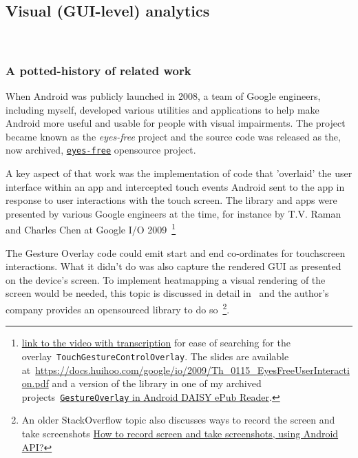 \subsection{Visual (GUI-level) analytics}~\label{sec:visual-gui-analytics}

\subsubsection{A potted-history of related work}
When Android was publicly launched in 2008, a team of Google engineers, including myself, developed various utilities and applications to help make Android more useful and usable for people with visual impairments. The project became known as the \emph{eyes-free} project and the source code was released as the, now archived, \href{https://code.google.com/archive/p/eyes-free/}{\texttt{eyes-free}} opensource project. 

A key aspect of that work was the implementation of code that 'overlaid' the user interface within an app and intercepted touch events Android sent to the app in response to user interactions with the touch screen. The library and apps were presented by various Google engineers at the time, for instance by T.V. Raman and Charles Chen at Google I/O 2009~\footnote{ \href{http://transcriptvids.com/v/xS-ju61vOQw.html}{link to the video with transcription} for ease of searching for the overlay~\texttt{TouchGestureControlOverlay}. The slides are available at~\url{https://docs.huihoo.com/google/io/2009/Th_0115_EyesFreeUserInteraction.pdf} and a version of the library in one of my archived projects~\href{https://github.com/julianharty/android-daisy-epub-reader/blob/master/src/com/google/marvin/widget/GestureOverlay.java}{\texttt{GestureOverlay} in Android DAISY ePub Reader}.} 

The Gesture Overlay code could emit start and end co-ordinates for touchscreen interactions. What it didn't do was also capture the rendered GUI as presented on the device's screen. To implement heatmapping a visual rendering of the screen would be needed, this topic is discussed in detail in~\citep{bolt2019_how_to_programmatically_capture_screen_on_android} and the author's company provides an opensourced library to do so~\footnote{An older StackOverflow topic also discusses ways to record the screen and take screenshots \href{https://stackoverflow.com/questions/32513379/how-to-record-screen-and-take-screenshots-using-android-api}{How to record screen and take screenshots, using Android API?}}. 

